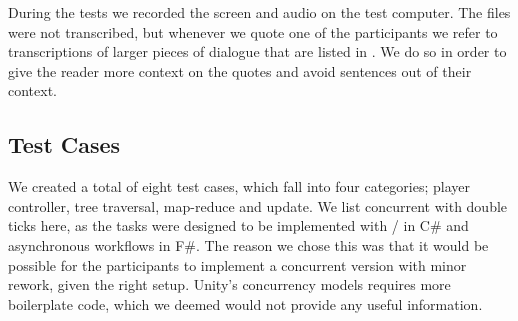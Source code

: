 During the tests we recorded the screen and audio on the test computer. The files were not transcribed, but whenever we quote one of the participants we refer to transcriptions of larger pieces of dialogue that are listed in . We do so in order to give the reader more context on the quotes and avoid  sentences out of their context.

\subsection{Test Cases} \label{sec:usability:test:cases}
We created a total of eight test cases, which fall into four categories; player controller, tree traversal, map-reduce and  update. We list concurrent with double ticks here, as the tasks were designed to be implemented with / in C\# and asynchronous workflows in F\#. The reason we chose this was that it would be possible for the participants to implement a concurrent version with minor rework, given the right setup. Unity's concurrency models requires more boilerplate code, which we deemed would not provide any useful information.


